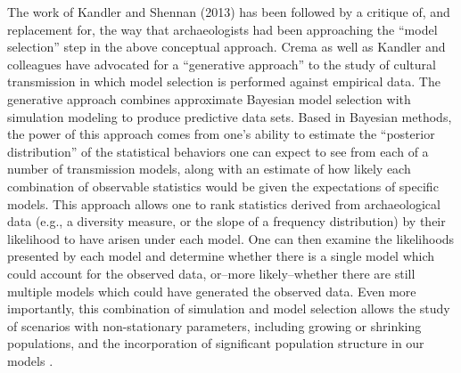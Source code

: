 The work of Kandler and Shennan (2013) has been followed by a critique of, and replacement for, the way that archaeologists had been approaching the “model selection” step in the above conceptual approach. Crema \citeyearpar{Crema2014} as well as Kandler and colleagues  have advocated for a “generative approach” to the study of  cultural transmission in which model selection is performed against empirical data. The generative approach combines approximate Bayesian model selection \citep{sisson2018handbook} with simulation modeling to produce predictive data sets.  Based in Bayesian methods, the power of this approach comes from one’s ability to estimate the “posterior distribution” of the statistical behaviors one can expect to see from each of a number of transmission models, along with an estimate of how likely each combination of observable statistics would be given the expectations of specific models. This approach allows one to rank statistics derived from archaeological data (e.g., a diversity measure, or the slope of a frequency distribution) by their likelihood to have arisen under each model. One can then examine the likelihoods presented by each model and determine whether there is a single model which could account for the observed data, or–more likely–whether there are still multiple models which could have generated the observed data.  Even more importantly, this combination of simulation and model selection allows the study of scenarios with non-stationary parameters, including growing or shrinking populations, and the incorporation of significant population structure in our models \citep{kandler2018generative,Rorabaugh2014}. 

